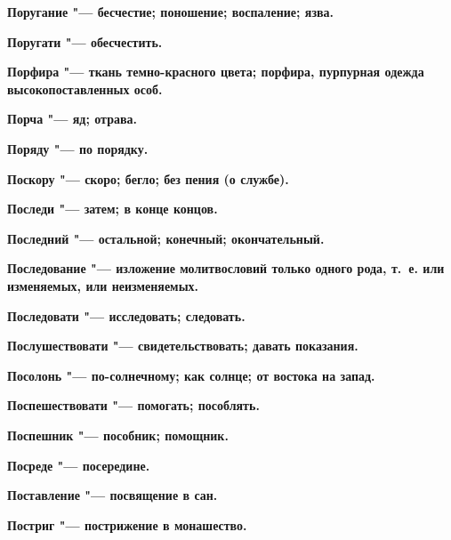 \begin{mymulticols}{2}
\bfseries Поругание\normalfont{} "--- бесчестие; поношение; воспаление; язва. 




\bfseries Поругати\normalfont{} "--- обесчестить. 




\bfseries Порфира\normalfont{} "--- ткань темно-красного цвета; порфира, пурпурная одежда высокопоставленных особ. 




\bfseries Порча\normalfont{} "--- яд; отрава. 




\bfseries Поряду\normalfont{} "--- по порядку. 




\bfseries Поскору\normalfont{} "--- скоро; бегло; без пения (о службе). 




\bfseries Последи\normalfont{} "--- затем; в конце концов. 




\bfseries Последний\normalfont{} "--- остальной; конечный; окончательный. 




\bfseries Последование\normalfont{} "--- изложение молитвословий только одного рода, т.~е. или изменяемых, или неизменяемых. 




\bfseries Последовати\normalfont{} "--- исследовать; следовать. 




\bfseries Послушествовати\normalfont{} "--- свидетельствовать; давать показания. 




\bfseries Посолонь\normalfont{} "--- по-солнечному; как солнце; от востока на запад. 




\bfseries Поспешествовати\normalfont{} "--- помогать; пособлять. 




\bfseries Поспешник\normalfont{} "--- пособник; помощник. 




\bfseries Посреде\normalfont{} "--- посередине. 




\bfseries Поставление\normalfont{} "--- посвящение в сан. 




\bfseries Постриг\normalfont{} "--- пострижение в монашество. 





\end{mymulticols}

